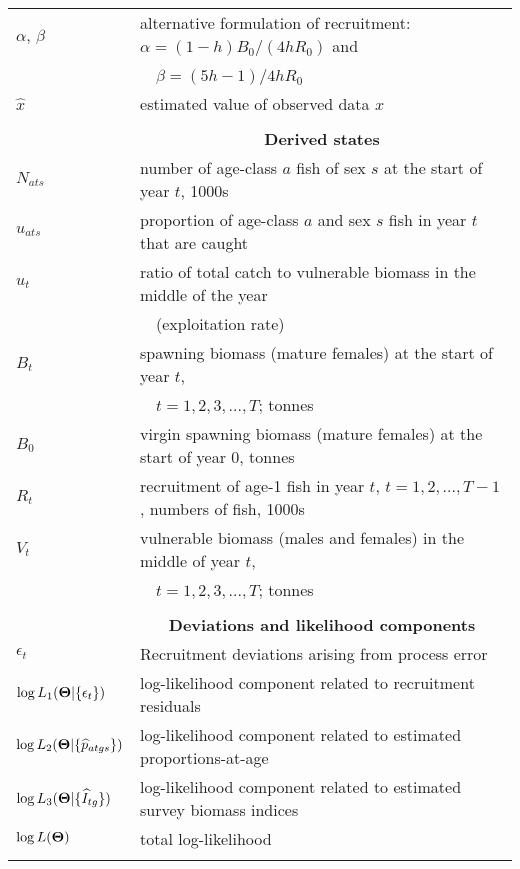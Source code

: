 \documentclass[11pt]{article}   %
\def\bfTh{{\bf \Theta}}          %
\begin{document}
\begin{tabular}{ll}
$\alpha$, $\beta$ & alternative formulation of recruitment: $\alpha = (1 - h) B_0 / (4 h R_0)$ and \\
 & ~~$\beta = (5 h - 1) / 4 h R_0$\\ 
$\widehat{x}$ & estimated value of observed data $x$\\
\\[-.5ex]

& \multicolumn{1}{c}{{\bf Derived states}} \\[0.5ex]
$N_{ats}$ & number of age-class $a$ fish of sex $s$ at the start of year $t$, 1000s\\
$u_{ats}$ & proportion of age-class $a$ and sex $s$ fish in year $t$ that are caught\\
$u_t$ & ratio of total catch to vulnerable biomass in the middle of the year\\%
 & ~~(exploitation rate)\\
$B_t$ & spawning biomass (mature females) at the start of year $t$,\\
& ~~$t=1,2,3,...,T$; tonnes \\
$B_0$ & virgin spawning biomass (mature females) at the start of year $0$, tonnes \\
$R_t$ & recruitment of age-1 fish in year $t$, $t=1,2,...,T-1$, numbers of fish, 1000s\\
$V_t$ & vulnerable biomass (males and females) in the middle of year $t$,\\
      & ~~$t=1,2,3,...,T$; tonnes\\

\\[-.5ex]
& \multicolumn{1}{c}{{\bf Deviations and likelihood components}} \\[0.5ex]
$\epsilon_t$ & Recruitment deviations arising from process error\\
$\log L_1(\bfTh | \{ \epsilon_t \}) $ & log-likelihood component related to recruitment residuals\\
$\log L_2(\bfTh | \{ \widehat{p}_{atgs} \} )$ & log-likelihood component related to estimated proportions-at-age\\
$\log L_3(\bfTh | \{ \widehat{I}_{tg} \} )$ &  log-likelihood component related to estimated survey biomass indices \\
$\log L(\bfTh)$ & total log-likelihood \\
\\[-.5ex]


\end{tabular}
\end{document}
